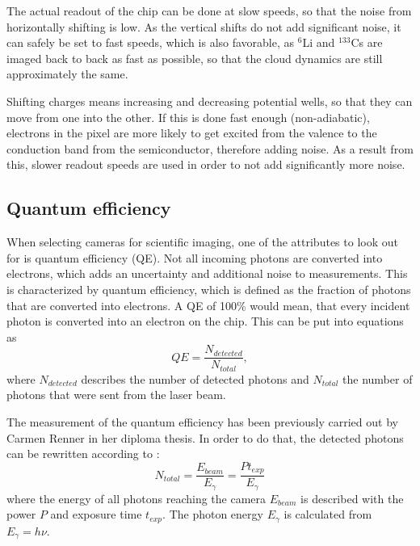 The actual readout of the chip can be done at slow speeds, so that the noise from horizontally shifting is low. As the vertical shifts do not add significant noise, it can safely be set to fast speeds, which is also favorable, as $^6$Li and $^{133}$Cs are imaged back to back as fast as possible, so that the cloud dynamics are still approximately the same.

Shifting charges means increasing and decreasing potential wells, so that they can move from one into the other. If this is done fast enough (non-adiabatic), electrons in the pixel are more likely to get excited from the valence to the conduction band from the semiconductor, therefore adding noise. As a result from this, slower readout speeds are used in order to not add significantly more noise.


\newpage
\subsection{Quantum efficiency}
\label{ch:quantumeff}
When selecting cameras for scientific imaging, one of the attributes to look out for is quantum efficiency (QE). Not all incoming photons are converted into electrons, which adds an uncertainty and additional noise to measurements. This is characterized by quantum efficiency, which is defined as the fraction of photons that are converted into electrons. A  QE of 100\% would mean, that every incident photon is converted into an electron on the chip. This can be put into equations as
\begin{equation}
QE = \frac{N_{detected}}{N_{total}},
\end{equation}
where $N_{detected}$ describes the number of detected photons and $N_{total}$ the number of photons that were sent from the laser beam.

The measurement of the quantum efficiency has been previously carried out by Carmen Renner \cite{Renner2014} in her diploma thesis. In order to do that, the detected photons can be rewritten according to \cite{Murmann2011}:
\begin{equation}
N_{total} = \frac{E_{beam}}{E_\gamma} = \frac{P t_{exp}}{E_\gamma}
\end{equation}
where the energy of all photons reaching the camera $E_{beam}$ is described with the power $P$ and exposure time $t_{exp}$. The photon energy $E_\gamma$ is calculated from $E_\gamma= h\nu$.

